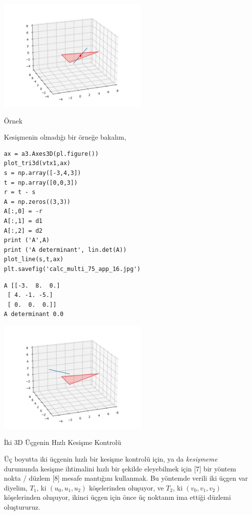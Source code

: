 \documentclass[12pt,fleqn]{article}\usepackage{../../common}
\begin{document}
\includegraphics[width=20em]{calc_multi_75_app_15.jpg}

Örnek

Kesişmenin olmadığı bir örneğe bakalım,

\begin{verbatim}
ax = a3.Axes3D(pl.figure())
plot_tri3d(vtx1,ax)
s = np.array([-3,4,3])
t = np.array([0,0,3])
r = t - s
A = np.zeros((3,3))
A[:,0] = -r
A[:,1] = d1
A[:,2] = d2
print ('A',A)
print ('A determinant', lin.det(A))
plot_line(s,t,ax)
plt.savefig('calc_multi_75_app_16.jpg')
\end{verbatim}

\begin{verbatim}
A [[-3.  8.  0.]
 [ 4. -1. -5.]
 [ 0.  0.  0.]]
A determinant 0.0
\end{verbatim}

\includegraphics[width=20em]{calc_multi_75_app_16.jpg}

İki 3D Üçgenin Hızlı Kesişme Kontrolü

Üç boyutta iki üçgenin hızlı bir kesişme kontrolü için, ya da {\em kesişmeme}
durumunda kesişme ihtimalini hızlı bir şekilde eleyebilmek için [7] bir yöntem
nokta / düzlem [8] mesafe mantığını kullanmak. Bu yöntemde verili iki üçgen var
diyelim, $T_1$, ki $(u_0,u_1,u_2)$ köşelerinden oluşuyor, ve $T_2$, ki
$(v_0,v_1,v_2)$ köşelerinden oluşuyor, ikinci üçgen için önce üç noktanın ima
ettiği düzlemi oluştururuz.
\end{document}
